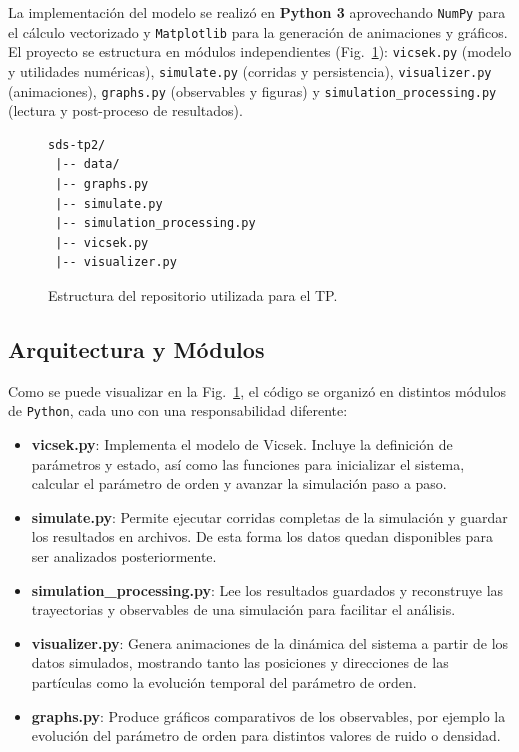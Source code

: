 \documentclass[12pt,a4paper]{article}
\begin{document}
La implementación del modelo se realizó en \textbf{Python 3} aprovechando \texttt{NumPy} para el cálculo vectorizado y \texttt{Matplotlib} para la generación de animaciones y gráficos. El proyecto se estructura en módulos independientes (Fig.~\ref{estructura}): 
\texttt{vicsek.py} (modelo y utilidades numéricas), 
\texttt{simulate.py} (corridas y persistencia),
\texttt{visualizer.py} (animaciones),
\texttt{graphs.py} (observables y figuras) y 
\texttt{simulation\_processing.py} (lectura y post-proceso de resultados).

\begin{figure}[h]
\centering
\begin{minipage}{0.78\linewidth}
\small
\begin{verbatim}
sds-tp2/
 |-- data/
 |-- graphs.py
 |-- simulate.py
 |-- simulation_processing.py
 |-- vicsek.py
 |-- visualizer.py
\end{verbatim}
\end{minipage}
\caption{Estructura del repositorio utilizada para el TP.}
\label{estructura}
\end{figure}

\subsection{Arquitectura y Módulos}

Como se puede visualizar en la Fig.~\ref{estructura}, el código se organizó en distintos módulos de \texttt{Python}, cada uno con una responsabilidad diferente:

\begin{itemize}
    \item \textbf{vicsek.py}: Implementa el modelo de Vicsek. Incluye la definición de parámetros y estado, así como las funciones para inicializar el sistema, calcular el parámetro de orden y avanzar la simulación paso a paso.
    
    \item \textbf{simulate.py}: Permite ejecutar corridas completas de la simulación y guardar los resultados en archivos. De esta forma los datos quedan disponibles para ser analizados posteriormente.
    
    \item \textbf{simulation\_processing.py}: Lee los resultados guardados y reconstruye las trayectorias y observables de una simulación para facilitar el análisis.
    
    \item \textbf{visualizer.py}: Genera animaciones de la dinámica del sistema a partir de los datos simulados, mostrando tanto las posiciones y direcciones de las partículas como la evolución temporal del parámetro de orden.
    
    \item \textbf{graphs.py}: Produce gráficos comparativos de los observables, por ejemplo la evolución del parámetro de orden para distintos valores de ruido o densidad.
\end{itemize}
\end{document}
